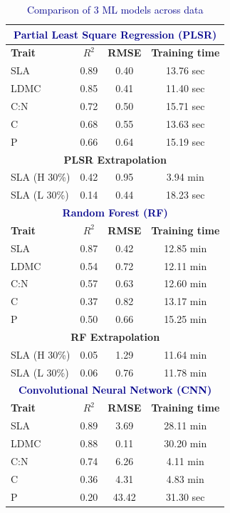 \documentclass[12pt,a4paper]{report}
\begin{document}
\begin{table}[h!]
\centering
\caption{\textcolor{darkblue}{Comparison of 3 ML models across data}}
\label{tab:main-sub-table}
\begin{tabular}{lccc}
\toprule
\multicolumn{4}{c}{\textbf{\textcolor{darkblue}{Partial Least Square Regression (PLSR)}}} \\ 
\midrule
\textbf{Trait} & \textbf{$R^2$} & \textbf{RMSE} & \textbf{Training time} \\
\midrule
SLA  & 0.89 & 0.40 & 13.76 sec \\
LDMC & 0.85 & 0.41 & 11.40 sec \\
C:N  & 0.72 & 0.50 & 15.71 sec \\
C    & 0.68 & 0.55 & 13.63 sec \\
P    & 0.66 & 0.64 & 15.19 sec \\
\midrule
\multicolumn{4}{c}{\textbf{{PLSR Extrapolation}}} \\ 
\midrule
SLA (H 30\%) & 0.42 & 0.95 &  3.94 min \\
SLA  (L 30\%)& 0.14 & 0.44 &  18.23 sec \\
\midrule
\multicolumn{4}{c}{\textbf{\textcolor{darkblue}{Random Forest (RF)}}} \\ 
\midrule
\textbf{Trait} & \textbf{$R^2$} & \textbf{RMSE} & \textbf{Training time} \\
\midrule
SLA  & 0.87 & 0.42 & 12.85 min \\
LDMC & 0.54 & 0.72 & 12.11 min \\
C:N  & 0.57 & 0.63 & 12.60 min \\
C    & 0.37 & 0.82 & 13.17 min \\
P    & 0.50 & 0.66 & 15.25 min \\
\midrule
\multicolumn{4}{c}{\textbf{{RF Extrapolation}}} \\ 
\midrule
SLA (H 30\%) & 0.05 & 1.29 &  11.64 min \\
SLA  (L 30\%)& 0.06 & 0.76 & 11.78 min \\
\midrule
\multicolumn{4}{c}{\textbf{\textcolor{darkblue}{Convolutional Neural Network (CNN)}}} \\
\midrule
\textbf{Trait} & \textbf{$R^2$} & \textbf{RMSE} & \textbf{Training time} \\
\midrule
SLA  & 0.89 & 3.69 & 28.11 min \\
LDMC & 0.88 & 0.11 & 30.20 min \\
C:N  & 0.74 & 6.26 & 4.11 min \\
C    & 0.36 & 4.31 & 4.83 min \\
P    & 0.20 & 43.42 & 31.30 sec \\
\bottomrule
\end{tabular}
\end{table}
\end{document}
